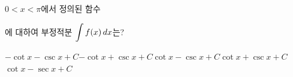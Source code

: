 $0<x<\pi$에서 정의된 함수 \par\smallskip{}\par\smallskip\noindent 에 대하여 부정적분 $\displaystyle\int f(x)\mkern3mu dx$는? 
\begin{choicesii}{$-\cot x-\csc x+C$}{$-\cot x+\csc x+C$}{$\cot x-\csc x+C$}{$\cot x+\csc x+C$}{$\cot x-\sec x+C$}\end{choicesii}
